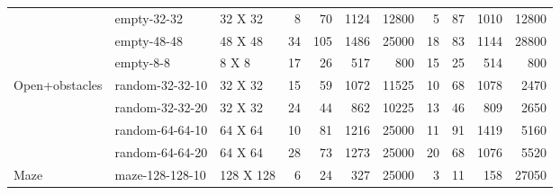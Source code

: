 \begin{table*}[]
\begin{tabular}{@{}lll|rrrr|rrrr@{}}
                                & empty-32-32           & 32 X 32    & 8                       & 70                      & 1124                       & 12800                   & 5                       & 87                      & 1010                       & 12800                   \\
                                & empty-48-48           & 48 X 48    & 34                      & 105                     & 1486                       & 25000                   & 18                      & 83                      & 1144                       & 28800                   \\
                                & empty-8-8             & 8 X 8      & 17                      & 26                      & 517                        & 800                     & 15                      & 25                      & 514                        & 800                     \\
\midrule \multirow{4}{*}{Open+obstacles} & random-32-32-10       & 32 X 32    & 15                      & 59                      & 1072                       & 11525                   & 10                      & 68                      & 1078                       & 2470                    \\
                                & random-32-32-20       & 32 X 32    & 24                      & 44                      & 862                        & 10225                   & 13                      & 46                      & 809                        & 2650                    \\
                                & random-64-64-10       & 64 X 64    & 10                      & 81                      & 1216                       & 25000                   & 11                      & 91                      & 1419                       & 5160                    \\
                                & random-64-64-20       & 64 X 64    & 28                      & 73                      & 1273                       & 25000                   & 20                      & 68                      & 1076                       & 5520                    \\
\midrule \multirow{4}{*}{Maze}           & maze-128-128-10       & 128 X 128  & 6                       & 24                      & 327                        & 25000                   & 3                       & 11                      & 158                        & 27050                   \\

\end{tabular}
\end{table*}
